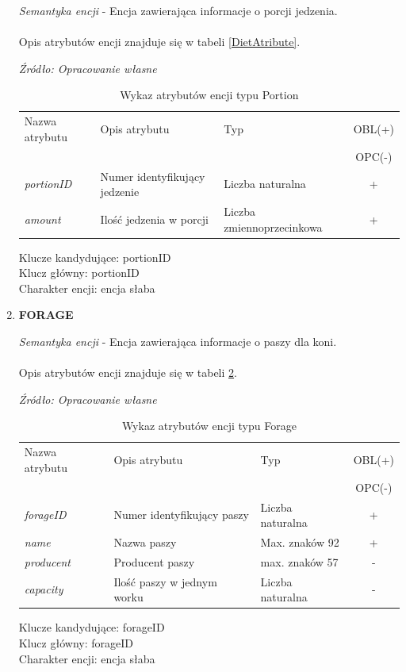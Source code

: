\documentclass[12pt,twoside]{report}
\begin{document}
\begin{enumerate}[start=1,label={\bfseries ENC\textbackslash0\arabic*}]
	\textit{Semantyka encji} - Encja zawierająca informacje o porcji jedzenia.
	\\ \\
	Opis atrybutów encji znajduje się w tabeli \ref{DietAtribute}.
	
	\begin{table}[H]
		\caption{Wykaz atrybutów encji typu Portion}
		\textit{Źródło: Opracowanie własne}
		\label{PortionAtribute}
		\centering
		\begin{tabular}{|l|l|l|c|}
			\hline
			Nazwa atrybutu & Opis atrybutu & Typ & OBL(+) \\
			& & &  OPC(-) \\
			\hline
			\textit{portionID} & Numer identyfikujący jedzenie & Liczba naturalna & + \\
			\hline
			\textit{amount} &  Ilość jedzenia w porcji & Liczba zmiennoprzecinkowa & + \\
			\hline
		\end{tabular}

	\end{table}
	Klucze kandydujące: portionID \\
	Klucz główny: portionID \\
	Charakter encji: encja słaba \\
	
	\item \textbf{FORAGE}
	
	\textit{Semantyka encji} - Encja zawierająca informacje o paszy dla koni.
	\\ \\
	Opis atrybutów encji znajduje się w tabeli \ref{ForageAtribute}.
	
	\begin{table}[H]
		\caption{Wykaz atrybutów encji typu Forage }
		\textit{Źródło: Opracowanie własne}
		\label{ForageAtribute}
		\centering
		\begin{tabular}{|l|l|l|c|}
			\hline
			Nazwa atrybutu & Opis atrybutu & Typ & OBL(+) \\
			& & &  OPC(-) \\
			\hline
			\textit{forageID} & Numer identyfikujący paszy & Liczba naturalna & + \\
			\hline
			\textit{name} &  Nazwa paszy & Max. znaków 92 & + \\
			\hline
			\textit{producent} & Producent paszy & max. znaków 57 & - \\
			\hline
			\textit{capacity} & Ilość paszy w jednym worku & Liczba naturalna & - \\
			\hline
		\end{tabular}
	\end{table}
	Klucze kandydujące: forageID \\
	Klucz główny: forageID \\
	Charakter encji: encja słaba \\
	

\end{enumerate}
\end{document}
